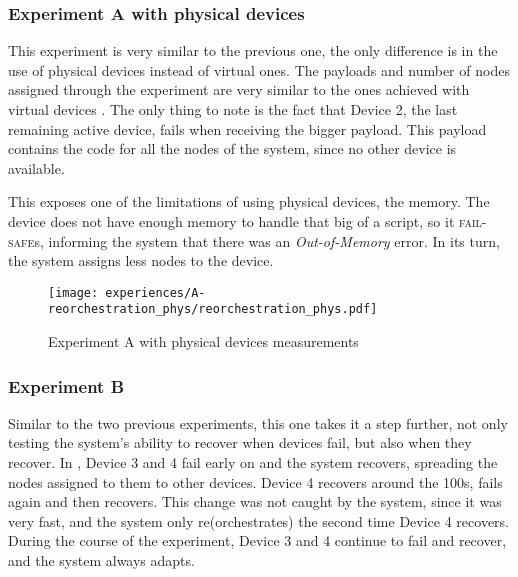 
\subsubsection{Experiment A with physical devices}

This experiment is very similar to the previous one, the only difference is in the use of physical devices instead of virtual ones. The payloads and number of nodes assigned through the experiment are very similar to the ones achieved with virtual devices . The only thing to note is the fact that Device 2, the  last remaining active device, fails when receiving the bigger payload. This payload contains the code for all the nodes of the system, since no other device is available. 

This exposes one of the limitations of using physical devices, the memory. The device does not have enough memory to handle that big of a script, so it \textsc{fail-safe}s, informing the system that there was an \textit{Out-of-Memory} error. In its turn, the system assigns less nodes to the device.

\begin{figure}[h]
\centering
\texttt{[image: experiences/A-reorchestration\_phys/reorchestration\_phys.pdf]}
\caption[Experiment A with physical devices measurements]{Experiment A with physical devices measurements}\label{fig:experiment_a_phys_graph}
\end{figure}


\subsubsection{Experiment B}

Similar to the two previous experiments, this one takes it a step further, not only testing the system's ability to recover when devices fail, but also when they recover. In , Device 3 and 4 fail early on and the system recovers, spreading the nodes assigned to them to other devices. Device 4 recovers around the 100s, fails again and then recovers. This change was not caught by the system, since it was very fast, and the system only re(orchestrates) the second time Device 4 recovers. During the course of the experiment, Device 3 and 4 continue to fail and recover, and the system always adapts.

